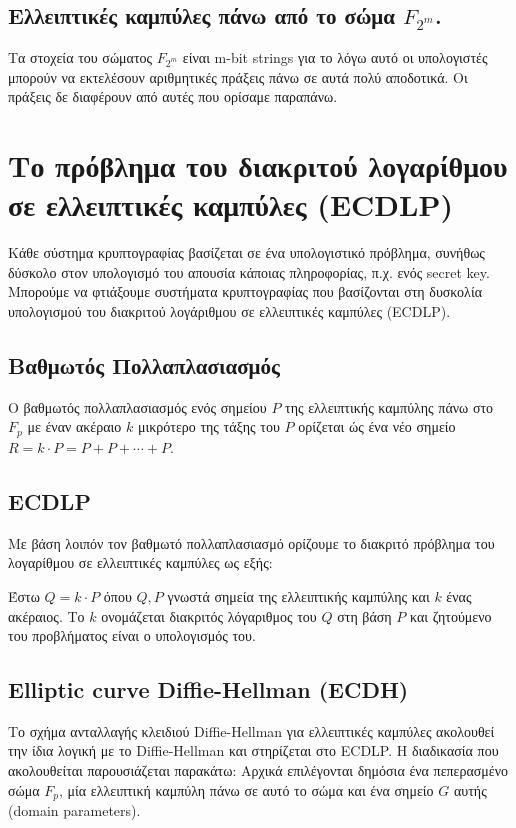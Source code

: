 \documentclass[12pt]{article}
\begin{document}
\subsection{Ελλειπτικές καμπύλες πάνω από το σώμα $F_{2^m}$.}
  Τα στοχεία του σώματος $F_{2^m}$ είναι m-bit strings για το λόγω αυτό οι υπολογιστές μπορούν να εκτελέσουν αριθμητικές πράξεις πάνω σε αυτά πολύ αποδοτικά. Οι πράξεις δε διαφέρουν από αυτές που ορίσαμε παραπάνω.
 
 \pagebreak
 
\section{Το πρόβλημα του διακριτού λογαρίθμου σε ελλειπτικές καμπύλες (ECDLP)} 
Κάθε σύστημα κρυπτογραφίας βασίζεται σε ένα υπολογιστικό πρόβλημα, συνήθως δύσκολο στον υπολογισμό του απουσία κάποιας πληροφορίας, π.χ. ενός secret key. Μπορούμε να φτιάξουμε συστήματα κρυπτογραφίας που βασίζονται στη δυσκολία υπολογισμού του διακριτού λογάριθμου σε ελλειπτικές καμπύλες (ECDLP).
\subsection{Βαθμωτός Πολλαπλασιασμός}
Ο βαθμωτός πολλαπλασιασμός ενός σημείου $P$ της ελλειπτικής καμπύλης πάνω στο $F_p$ με έναν ακέραιο $k$ μικρότερο της τάξης του $P$ ορίζεται ώς ένα νέο σημείο $R = k \cdot P = P + P + \cdots + P$.
\subsection{ECDLP}
Με βάση λοιπόν τον βαθμωτό πολλαπλασιασμό ορίζουμε το διακριτό πρόβλημα του λογαρίθμου σε ελλειπτικές καμπύλες ως εξής:

 Έστω $Q = k \cdot P$ όπου $Q, P$ γνωστά σημεία της ελλειπτικής καμπύλης και $k$ ένας ακέραιος. Το $k$ ονομάζεται διακριτός λόγαριθμος του $Q$ στη βάση $P$ και ζητούμενο του προβλήματος είναι ο υπολογισμός του.
\subsection{Elliptic curve Diffie-Hellman (ECDH)}
 Το σχήμα ανταλλαγής κλειδιού Diffie-Hellman για ελλειπτικές καμπύλες ακολουθεί την ίδια λογική με το Diffie-Hellman και στηρίζεται στο ECDLP.
Η διαδικασία που ακολουθείται παρουσιάζεται παρακάτω:
Αρχικά επιλέγονται δημόσια ένα πεπερασμένο σώμα $F_p$, μία ελλειπτική καμπύλη πάνω σε αυτό το σώμα και ένα σημείο $G$ αυτής (domain parameters).
\end{document}
